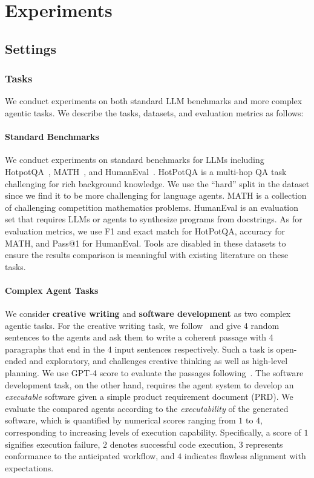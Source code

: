 \section{Experiments}

\subsection{Settings}

\subsubsection{Tasks}
We conduct experiments on both standard LLM benchmarks and more complex agentic tasks. We describe the tasks, datasets, and evaluation metrics as follows:




\paragraph{Standard Benchmarks}
We conduct experiments on standard benchmarks for LLMs including HotpotQA~\citep{yang-etal-2018-hotpotqa}, MATH~\citep{hendrycksmath2021}, and HumanEval~\citep{chen2021codex}. HotPotQA is a multi-hop QA task challenging for rich background knowledge. We use the ``hard'' split in the dataset since we find it to be more challenging for language agents. MATH is a collection of challenging competition mathematics problems. HumanEval is an evaluation set that requires LLMs or agents to synthesize programs from docstrings. As for evaluation metrics, we use F1 and exact match for HotPotQA, accuracy for MATH, and Pass@1 for HumanEval. Tools are disabled in these datasets to ensure the results comparison is meaningful with existing literature on these tasks. 

\paragraph{Complex Agent Tasks}
We consider \textbf{creative writing} and \textbf{software development} as two complex agentic tasks. For the creative writing task, we follow~\citet{yao2023tree} and give 4 random sentences to the agents and ask them to write a coherent passage with 4 paragraphs that end in the 4 input sentences respectively. Such a task is
open-ended and exploratory, and challenges creative thinking as well as high-level planning. We use GPT-4 score to evaluate the passages following~\citep{yao2023tree}. The software development task, on the other hand, requires the agent system to develop an \textit{executable} software given a simple product requirement document (PRD). We evaluate the compared agents according to the \textit{executability} of the generated software, which is quantified by numerical scores ranging from $1$ to $4$, corresponding to increasing levels of execution capability. Specifically, a score of $1$ signifies execution failure, $2$ denotes successful code execution, $3$ represents conformance to the anticipated workflow, and $4$ indicates flawless alignment with expectations.




